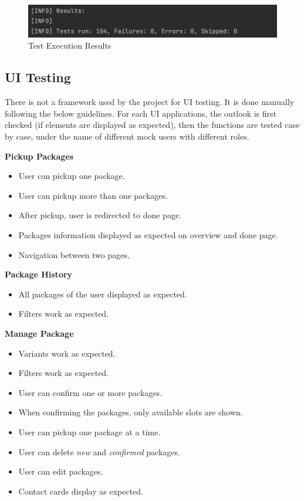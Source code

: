 \begin{figure}[H]
    \centering
    \includegraphics[width=0.9\linewidth]{images/test/test_results.png}
    \caption{Test Execution Results}
    \label{fig:test_exe}
\end{figure}

\subsection{UI Testing}
\label{subsec:test-ui}

There is not a framework used by the project for UI testing. It is done manually following the below guidelines. For each UI applications, the outlook is first checked (if elements are displayed as expected), then the functions are tested case by case, under the name of different mock users with different roles. 

\noindent
\textbf{Pickup Packages}
\begin{itemize}
    \item User can pickup one package.
    \item User can pickup more than one packages.
    \item After pickup, user is redirected to done page.
    \item Packages information displayed as expected on overview and done page.
    \item Navigation between two pages.
\end{itemize}

\noindent
\textbf{Package History}
\begin{itemize}
    \item All packages of the user displayed as expected.
    \item Filters work as expected.
\end{itemize}

\noindent
\textbf{Manage Package}
\begin{itemize}
    \item Variants work as expected.
    \item Filters work as expected.
    \item User can confirm one or more packages.
    \item When confirming the packages, only available slots are shown.
    \item User can pickup one package at a time.
    \item User can delete \textit{new} and \textit{confirmed} packages.
    \item User can edit packages.
    \item Contact cards display as expected.
\end{itemize}

